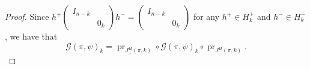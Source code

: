 \documentclass[12pt, reqno]{amsart}
\theoremstyle{definition}
\newcommand{\fieldCharacter}{\psi}
\newcommand{\IdentityMatrix}[1]{I_{#1}}
\newcommand{\GaussSum}[2]{\mathcal{G}\left(#1, #2\right)}
\newcommand{\pHJacquetModule}[2]{J^H_{+}\left(#1, #2\right)}
\newcommand{\nHJacquetModule}[2]{J^H_{-}\left(#1, #2\right)}
\newcommand{\ProjectionOperator}{\operatorname{pr}}
\begin{document}
	\begin{proof}
		Since $h^+ \left(\begin{smallmatrix}
			\IdentityMatrix{n-k}\\
			& 0_k
		\end{smallmatrix}\right) h^- = \left(\begin{smallmatrix}
			\IdentityMatrix{n-k}\\
			& 0_k
		\end{smallmatrix}\right)$ for any $h^+ \in H^{+}_k$ and $h^- \in H^{-}_k$, we have that
		\begin{displaymath}
		\GaussSum{\pi}{\fieldCharacter}_k = \ProjectionOperator_{\pHJacquetModule{\pi}{k}} \circ \GaussSum{\pi}{\fieldCharacter}_k \circ \ProjectionOperator_{\nHJacquetModule{\pi}{k}}.
		\end{displaymath}
		

\end{proof}
\end{document}
